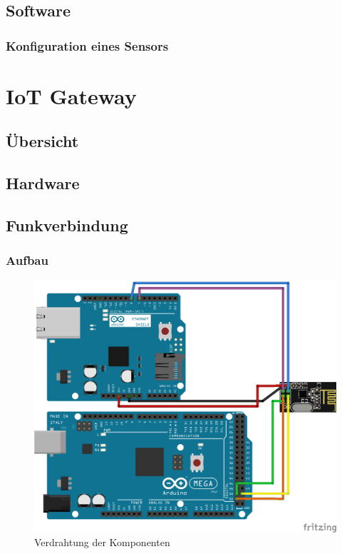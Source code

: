 \documentclass[
  12pt, %
  a4paper, %
  twoside, %
  openany, %
  numbers=noenddot, %
  BCOR=5mm, %
  parskip=half*, %
  thesis, %
]{bfhbook}
\begin{document}
 \section{Software}
 \subsection{Konfiguration eines Sensors}\label{config}

%
\chapter{IoT Gateway}
\section{Übersicht}
\section{Hardware}
\section{Funkverbindung}
\subsection{Aufbau}
\begin{figure}[htp]
  \begin{center}
    \includegraphics[width=12cm, left]{Bilder/MQTT-Gateway-Design_Steckplatine.png}
  \end{center}
    \caption{Verdrahtung der Komponenten}
\end{figure}
\end{document}
